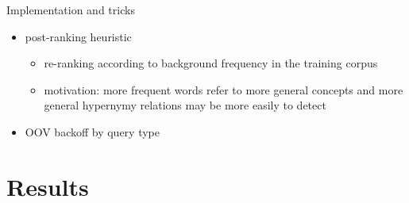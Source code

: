 \documentclass{beamer}
\newlength{\onecolwid}
\begin{document}
\begin{frame}[t]
\begin{columns}[t]
\begin{column}{\onecolwid}
\begin{block}{Implementation and tricks}
\begin{itemize}
      \item \alert{post-ranking} heuristic
        \begin{itemize}
          \item re-ranking according to background frequency in the training corpus
          \item motivation: more frequent words refer to more general concepts
            and more general hypernymy relations may be more easily to detect
        \end{itemize}
      \item {OOV backoff by query type}

  \end{itemize}
\end{block}

  \section{Results} \label{sec:results}




\end{column}
\end{columns}
\end{frame}
\end{document}
